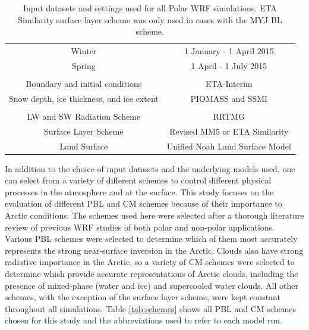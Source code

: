 \begin{table}[t]
\centering
\footnotesize
\doublespacing
{
\begin{tabular}{| c | c |}
\hline
\rowcolor[HTML]{F3F3F3} \multicolumn{2}{|c|}{\textbf{Dates}} \\
\hline
Winter & 1 January - 1 April 2015 \\
Spring & 1 April - 1 July 2015 \\
\hline
 \rowcolor[HTML]{F3F3F3} \multicolumn{2}{|c|}{\textbf{Input Datasets}} \\
\hline
 Boundary and initial conditions & ETA-Interim \\
 Snow depth, ice thickness, and ice extent & PIOMASS and SSMI \\
\hline
\rowcolor[HTML]{F3F3F3} \multicolumn{2}{|c|}{\textbf{Polar WRF Settings}} \\
\hline
 LW and SW Radiation Scheme & RRTMG \\ 
 Surface Layer Scheme & Revised MM5 or ETA Similarity \\
 Land Surface & Unified Noah Land Surface Model  \\ 
  \hline
\end{tabular}}
\caption[WRF input datasets, dates, and settings.]{Input datasets and settings used for all Polar WRF simulations. ETA Similarity surface layer scheme was only used in cases with the MYJ BL scheme.}
\label{tab:setup}
\end{table}

In addition to the choice of input datasets and the underlying models used, one can select from a variety of different schemes to control different physical processes in the atmosphere and at the surface. This study focuses on the evaluation of different PBL and CM schemes because of their importance to Arctic conditions. The schemes used here were selected after a thorough literature review of previous WRF studies of both polar and non-polar applications. Various PBL schemes were selected to determine which of them most accurately represents the strong near-surface inversion in the Arctic. Clouds also have strong radiative importance in the Arctic, so a variety of CM schemes were selected to determine which provide accurate representations of Arctic clouds, including the presence of mixed-phase (water and ice) and supercooled water clouds. All other schemes, with the exception of the surface layer scheme, were kept constant throughout all simulations. Table \ref{tab:schemes} shows all PBL and CM schemes chosen for this study and the abbreviations used to refer to each model run. 


